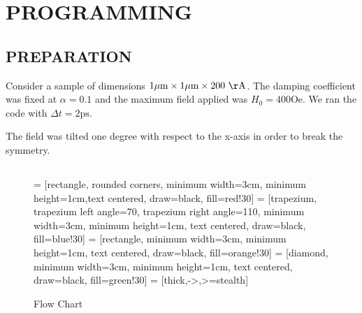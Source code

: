 \documentclass{article}
\begin{document}
\section{PROGRAMMING}
\subsection{PREPARATION}
Consider a sample of dimensions $1\mu \mathrm{m}\times1\mu \mathrm{m}\times 200~\mathrm{\AA}$. The damping coefficient was fixed at $\alpha=0.1$ and the maximum field applied was $H_{0}=400 \mathrm{Oe}$. We ran the code with $\Delta t=2 \mathrm{ps}$.

The field was tilted one degree with respect to the x-axis in order to break the symmetry.
\subsection{}
\begin{figure}[h]
 = [rectangle, rounded corners, minimum width=3cm, minimum height=1cm,text centered, draw=black, fill=red!30]
 = [trapezium, trapezium left angle=70, trapezium right angle=110, minimum width=3cm, minimum height=1cm, text centered, draw=black, fill=blue!30]
 = [rectangle, minimum width=3cm, minimum height=1cm, text centered, draw=black, fill=orange!30]
 = [diamond, minimum width=3cm, minimum height=1cm, text centered, draw=black, fill=green!30]
 = [thick,->,>=stealth]
\centering
{}
\caption{Flow Chart}
\end{figure}
\end{document}
